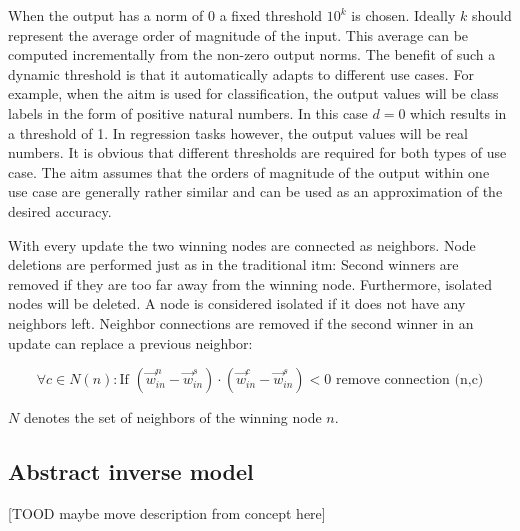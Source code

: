 When the output has a norm of $0$ a fixed threshold $10^k$ is chosen. Ideally $k$ should represent the average order of magnitude of the input. This average can be computed incrementally from the non-zero output norms. The benefit of such a dynamic threshold is that it automatically adapts to different use cases. For example, when the \gls{aitm} is used for classification, the output values will be class labels in the form of positive natural numbers. In this case $d=0$ which results in a threshold of 1. In regression tasks however, the output values will be real numbers. It is obvious that different thresholds are required for both types of use case. The \gls{aitm} assumes that the orders of magnitude of the output within one use case are generally rather similar and can be used as an approximation of the desired accuracy.

With every update the two winning nodes are connected as neighbors. Node deletions are performed just as in the traditional \gls{itm}: Second winners are removed if they are too far away from the winning node. Furthermore, isolated nodes will be deleted. A node is considered isolated if it does not have any neighbors left. Neighbor connections are removed if the second winner in an update can replace a previous neighbor:

\begin{equation}
\forall c \in N(n): \text{If~} (\vec{w}^n_{in}-\vec{w}^s_{in}) \cdot (\vec{w}^c_{in}-\vec{w}^s_{in}) < 0 \text{~remove connection (n,c)}
\end{equation}

$N$ denotes the set of neighbors of the winning node $n$.

\subsection{Abstract inverse model}
[TOOD maybe move description from concept here]